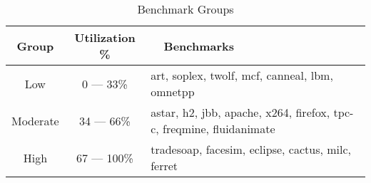 \begin{table}[t]
\centering
  \begin{tabular}{|c|c|p{}|}
    \hline
    Group & Utilization \% & ~~Benchmarks \\
    \hline
    Low        & 0 --- 33\% & art, soplex, twolf, mcf, canneal, lbm, omnetpp \\
    \hline
    Moderate   & 34 --- 66\% & astar, h2, jbb, apache, x264, firefox, tpc-c, freqmine, fluidanimate \\
    \hline
    High       & 67 --- 100\% & tradesoap, facesim, eclipse, cactus, milc, ferret \\
    \hline
  \end{tabular}

\caption{Benchmark Groups}
\label{table:benchmark_categories}
\end{table}

